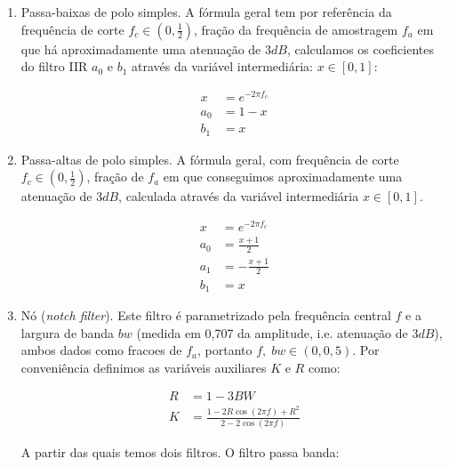 \begin{enumerate}
\item Passa-baixas de polo simples. A fórmula geral tem
por referência da frequência de corte $f_c \in (0,\frac{1}{2})$,
fração da frequência de amostragem $f_a$
em que há aproximadamente uma atenuação de $3dB$,
calculamos os coeficientes do filtro IIR
$a_0$ e $b_1$ 
através da variável intermediária: $x \in [0,1]$:

\begin{equation}\label{eq:passa-baixas}
\begin{split}
x & =e^{-2\pi f_c} \\
a_0 & =  1-x \\
b_1 & =  x
\end{split}
\end{equation}

\item Passa-altas de polo simples. A fórmula geral,
com frequência de corte $f_c \in (0,\frac{1}{2})$, fração
de $f_a$ em que conseguimos aproximadamente uma atenuação de $3dB$, calculada através da variável
intermediária $x \in [0,1]$.


\begin{equation}\label{eq:passa-altas}
\begin{split}
x & =e^{-2\pi f_c} \\
a_0 & =  \frac{x+1}{2} \\
a_1 & =  -\frac{x+1}{2} \\
b_1 & =  x
\end{split}
\end{equation}


\item Nó (\emph{notch filter}). Este filtro é parametrizado
pela frequência central $f$ e a largura de banda $bw$
(medida em 0,707 da amplitude, i.e. atenuação de $3dB$),
ambos dados como fracoes de $f_a$, portanto $f,\; bw \in (0,0,5)$.
Por conveniência definimos as variáveis auxiliares $K$ e $R$ como:

\begin{equation}
\begin{split}
R & = 1 - 3BW \\
K & = \frac{1-2R\cos(2\pi f) + R^2}{2 - 2 \cos (2 \pi f)}
\end{split}
\end{equation}

A partir das quais temos dois filtros. O filtro passa banda:


\end{enumerate}
